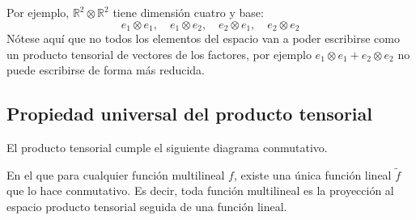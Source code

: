 \documentclass[paper=a4, fontsize=11pt, spanish]{scrartcl}
\numberwithin{equation}{section} %
\numberwithin{figure}{section} %
\numberwithin{table}{section} %
\begin{document}
    Por ejemplo, $\mathbb{R}^2\otimes\mathbb{R}^2$ tiene dimensión cuatro y base:
    $$ e_1\otimes e_1,\quad e_1\otimes e_2,\quad  e_2 \otimes e_1,\quad  e_2 \otimes e_2 $$
    Nótese aquí que no todos los elementos del espacio van a poder escribirse como un producto tensorial
    de vectores de los factores, por ejemplo $e_1 \otimes e_1 + e_2 \otimes e_2$ no puede escribirse de forma
    más reducida. %
    
  \subsection{Propiedad universal del producto tensorial}
    El producto tensorial cumple el siguiente diagrama conmutativo.
    \begin{center}
      \end{center}
    En el que para cualquier función multilineal $f$, existe una única función
    lineal $\tilde f$ que lo hace conmutativo. Es decir, toda función multilineal es la proyección 
    al espacio producto tensorial seguida de una función lineal.
    
\end{document}
